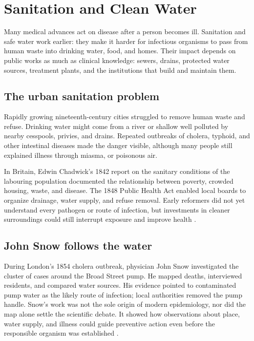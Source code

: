 \documentclass[12pt,oneside]{book}
\begin{document}
\chapter[Sanitation and Clean Water]{Sanitation and Clean Water}

Many medical advances act on disease after a person becomes ill. Sanitation
and safe water work earlier: they make it harder for infectious organisms
to pass from human waste into drinking water, food, and homes. Their impact
depends on public works as much as clinical knowledge: sewers, drains,
protected water sources, treatment plants, and the institutions that build
and maintain them.

\section{The urban sanitation problem}
Rapidly growing nineteenth-century cities struggled to remove human waste
and refuse. Drinking water might come from a river or shallow well polluted
by nearby cesspools, privies, and drains. Repeated outbreaks of cholera,
typhoid, and other intestinal diseases made the danger visible, although
many people still explained illness through miasma, or poisonous air.

In Britain, Edwin Chadwick's 1842 report on the sanitary conditions of the
labouring population documented the relationship between poverty, crowded
housing, waste, and disease. The 1848 Public Health Act enabled local boards
to organize drainage, water supply, and refuse removal. Early reformers did
not yet understand every pathogen or route of infection, but investments in
cleaner surroundings could still interrupt exposure and improve health
\cite{chadwickReport,ukPublicHealthAct}.

\section{John Snow follows the water}
During London's 1854 cholera outbreak, physician John Snow investigated the
cluster of cases around the Broad Street pump. He mapped deaths, interviewed
residents, and compared water sources. His evidence pointed to contaminated
pump water as the likely route of infection; local authorities removed the
pump handle. Snow's work was not the sole origin of modern epidemiology, nor
did the map alone settle the scientific debate. It showed how observations
about place, water supply, and illness could guide preventive action even
before the responsible organism was established
\cite{cdcJohnSnow}.
\end{document}
